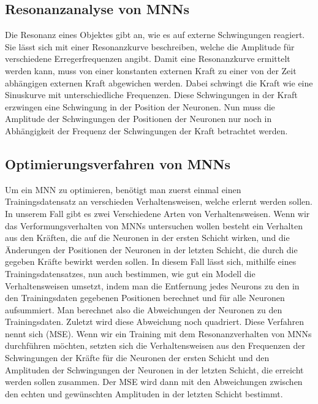 


\FloatBarrier
\subsection{Resonanzanalyse von MNNs}

Die Resonanz eines Objektes gibt an, wie es auf externe Schwingungen reagiert. Sie lässt sich mit einer Resonanzkurve beschreiben, welche die Amplitude für verschiedene Erregerfrequenzen angibt. Damit eine Resonanzkurve ermittelt werden kann, muss von einer konstanten externen Kraft zu einer von der Zeit abhängigen externen Kraft abgewichen werden. Dabei schwingt die Kraft wie eine Sinuskurve mit unterschiedliche Frequenzen. Diese Schwingungen in der Kraft erzwingen eine Schwingung in der Position der Neuronen. Nun muss die Amplitude der Schwingungen der Positionen der Neuronen nur noch in Abhängigkeit der Frequenz der Schwingungen der Kraft betrachtet werden.

\subsection{Optimierungsverfahren von MNNs}

Um ein MNN zu optimieren, benötigt man zuerst einmal einen Trainingsdatensatz an verschieden Verhaltensweisen, welche erlernt werden sollen. In unserem Fall gibt es zwei Verschiedene Arten von Verhaltensweisen. Wenn wir das Verformungsverhalten von MNNs untersuchen wollen besteht ein Verhalten aus den Kräften, die auf die Neuronen in der ersten Schicht wirken, und die Änderungen der Positionen der Neuronen in der letzten Schicht, die durch die gegeben Kräfte bewirkt werden sollen. In diesem Fall lässt sich, mithilfe eines Trainingsdatensatzes, nun auch bestimmen, wie gut ein Modell die Verhaltensweisen umsetzt, indem man die Entfernung jedes Neurons zu den in den Trainingsdaten gegebenen Positionen berechnet und für alle Neuronen aufsummiert. Man berechnet also die Abweichungen der Neuronen zu den Trainingsdaten. Zuletzt wird diese Abweichung noch quadriert. Diese Verfahren nennt sich  (MSE).
Wenn wir ein Training mit dem Resonanzverhalten von MNNs durchführen möchten, setzten sich die Verhaltensweisen aus den Frequenzen der Schwingungen der Kräfte für die Neuronen der ersten Schicht und den Amplituden der Schwingungen der Neuronen in der letzten Schicht, die erreicht werden sollen zusammen. Der MSE wird dann mit den Abweichungen zwischen den echten und gewünschten Amplituden in der letzten Schicht bestimmt.


